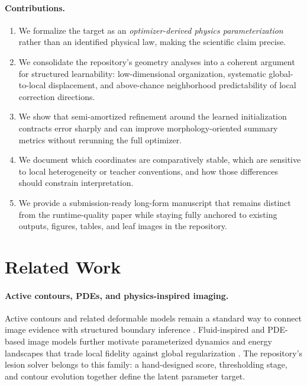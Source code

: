 \documentclass[11pt,a4paper]{article}
\begin{document}
\paragraph{Contributions.}
\begin{enumerate}[leftmargin=1.5em,itemsep=2pt]
\item We formalize the target as an \emph{optimizer-derived physics parameterization} rather than an identified physical law, making the scientific claim precise.
\item We consolidate the repository's geometry analyses into a coherent argument for structured learnability: low-dimensional organization, systematic global-to-local displacement, and above-chance neighborhood predictability of local correction directions.
\item We show that semi-amortized refinement around the learned initialization contracts error sharply and can improve morphology-oriented summary metrics without rerunning the full optimizer.
\item We document which coordinates are comparatively stable, which are sensitive to local heterogeneity or teacher conventions, and how those differences should constrain interpretation.
\item We provide a submission-ready long-form manuscript that remains distinct from the runtime-quality paper while staying fully anchored to existing outputs, figures, tables, and leaf images in the repository.
\end{enumerate}

\section{Related Work}
\paragraph{Active contours, PDEs, and physics-inspired imaging.}
Active contours and related deformable models remain a standard way to connect image evidence with structured boundary inference \citep{A_kass1988,A_chan2001,A_xu1998}.
Fluid-inspired and PDE-based image models further motivate parameterized dynamics and energy landscapes that trade local fidelity against global regularization \citep{A_navier1823,A_bertalmio2000,A_raissi2019}.
The repository's lesion solver belongs to this family: a hand-designed score, thresholding stage, and contour evolution together define the latent parameter target.
\end{document}
